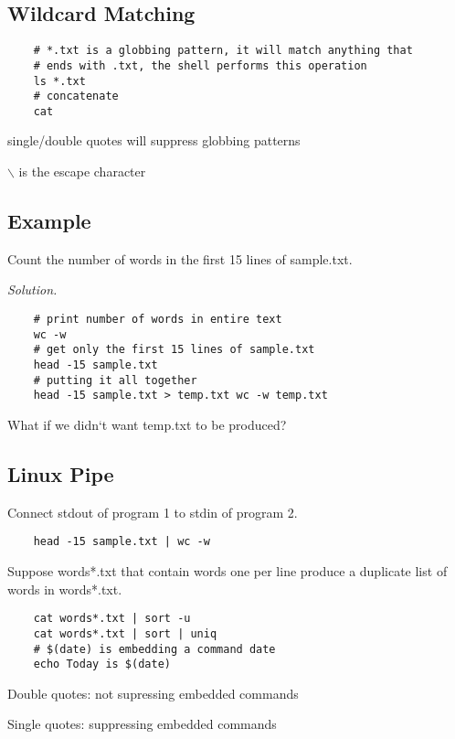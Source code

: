 \subsection{Wildcard Matching}
\begin{lstlisting}
    # *.txt is a globbing pattern, it will match anything that
    # ends with .txt, the shell performs this operation
    ls *.txt
    # concatenate
    cat
\end{lstlisting}
single/double quotes will suppress globbing patterns

$\backslash$ is the escape character

\subsection{Example}
Count the number of words in the first 15 lines of sample.txt.

\emph{Solution.}

\begin{lstlisting}
    # print number of words in entire text
    wc -w
    # get only the first 15 lines of sample.txt
    head -15 sample.txt
    # putting it all together
    head -15 sample.txt > temp.txt wc -w temp.txt
\end{lstlisting}

What if we didn`t want temp.txt to be produced?

\subsection{Linux Pipe}
Connect stdout of program 1 to stdin of program 2.
\begin{lstlisting}
    head -15 sample.txt | wc -w
\end{lstlisting}

Suppose words*.txt that contain words one per line produce
a duplicate list of words in words*.txt.
\begin{lstlisting}
    cat words*.txt | sort -u
    cat words*.txt | sort | uniq
    # $(date) is embedding a command date
    echo Today is $(date)
\end{lstlisting}
Double quotes: not supressing embedded commands

Single quotes: suppressing embedded commands